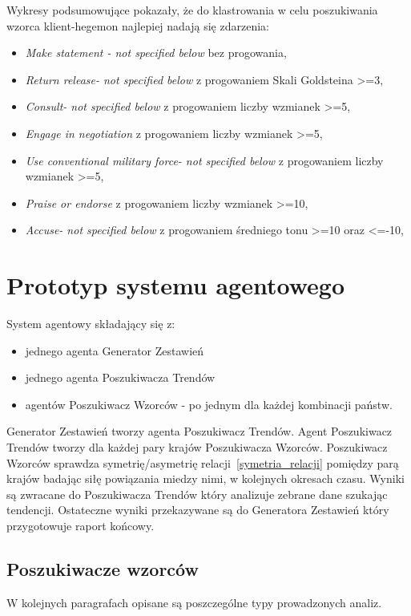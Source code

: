 \documentclass[11pt]{report}
\begin{document}
    Wykresy podsumowujące pokazały, że do klastrowania w celu poszukiwania wzorca klient-hegemon najlepiej nadają się zdarzenia:
    \begin{itemize}
        \item \textit{Make statement - not specified below} bez progowania,
        \item \textit{Return release- not specified below} z progowaniem Skali Goldsteina >=3,
        \item \textit{Consult- not specified below} z progowaniem liczby wzmianek >=5,
        \item \textit{Engage in negotiation} z progowaniem liczby wzmianek >=5,
        \item \textit{Use conventional military force- not specified below} z progowaniem liczby wzmianek >=5,
        \item \textit{Praise or endorse} z progowaniem liczby wzmianek >=10,
        \item \textit{Accuse- not specified below} z progowaniem średniego tonu >=10 oraz <=-10,
    \end{itemize}


    \section{Prototyp systemu agentowego}

    System agentowy składający się z:
    \begin{itemize}
        \item jednego agenta Generator Zestawień
        \item jednego agenta Poszukiwacza Trendów
        \item agentów Poszukiwacz Wzorców - po jednym dla każdej kombinacji państw.
    \end{itemize}

    Generator Zestawień tworzy agenta Poszukiwacz Trendów.
    Agent Poszukiwacz Trendów tworzy dla każdej pary krajów Poszukiwacza Wzorców.
    Poszukiwacz Wzorców sprawdza symetrię/asymetrię relacji~\ref{symetria_relacji} pomiędzy parą krajów badając siłę powiązania miedzy nimi, w kolejnych okresach czasu.
    Wyniki są zwracane do Poszukiwacza Trendów który analizuje zebrane dane szukając tendencji.
    Ostateczne wyniki przekazywane są do Generatora Zestawień który przygotowuje raport końcowy.

    \subsection{Poszukiwacze wzorców}
    W kolejnych paragrafach opisane są poszczególne typy prowadzonych analiz.
\end{document}
